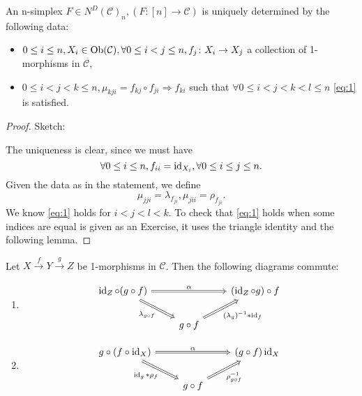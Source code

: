 \begin{prop}
	An n-simplex $ F \in N^D ( \mathcal{ C } )_n , ( F \colon [ n ] \to \mathcal{ C } ) $ is uniquely determined by the following data:
	\begin{itemize}
		\item 
		$ 0 \leq i \leq n , X_i \in \operatorname{Ob}( \mathcal{ C } ) , \forall  0 \leq  i < j \leq n, f_j \colon X_i \to X_j $ a collection of 1-morphisms in $ \mathcal{ C } $,
		
		\item 
		$ 0 \leq i < j < k \leq n , \mu_{ k j i } = f_{ k j } \circ f_{ j i } \Rightarrow f_{ k i } $ such that $ \forall 0 \leq i < j < k < l \leq n $ \eqref{eq:1} is satisfied.  
\end{itemize}
\end{prop}

\begin{proof}
	Sketch:
	
	The uniqueness is clear, since we must have 
	\[
		\forall 0 \leq i \leq n , f_{ i i } = \operatorname{id}_{ X_i }, \forall 0 \leq i \leq j \leq n.
	\]
	Given the data as in the statement, we define  
	\[
		\mu_{ j j i } = \lambda_{ f_{ j i } } , \mu_{ j i i } = \rho_{ f_{ j i } }.
	\]
	We know \ref{eq:1} holds for $ i < j < l < k $.
	To check that \ref{eq:1} holds when some indices are equal is given as an Exercise, it uses the triangle identity and the following lemma.
\end{proof}

\begin{lem}		
	Let $ X \xrightarrow{ f } Y \xrightarrow{ g } Z $ be 1-morphisms in $ \mathcal{ C } $.
	Then the following diagrams commute:
	\begin{enumerate}
		\item 
		\[
		\begin{tikzcd}
			\id_Z \circ ( g \circ f ) 
			\ar[rr, Rightarrow, "\alpha"]
			\ar[rd, Rightarrow, "\lambda_{ g \circ f }"' ]
			&&
			( \id_Z \circ g ) \circ f 
			\\
			&
			g \circ f 
			\ar[ru, Rightarrow, " ( \lambda_g)^{ - 1 } * \id_f "']
			&
		\end{tikzcd}
		\]
		
		\item 
		\[
		\begin{tikzcd}	
			g \circ ( f \circ \id_X )
			\ar[rr, Rightarrow, " \alpha " ]
			\ar[rd, Rightarrow, " \id_g * \rho_f "' ]
			&&
			( g \circ f ) \id_X
			\\
			&
			g \circ f 
			\ar[ru, Rightarrow , " \rho_{ g \circ f }^{ - 1 } "' ]
		\end{tikzcd}
		\]
	\end{enumerate}
\end{lem}


